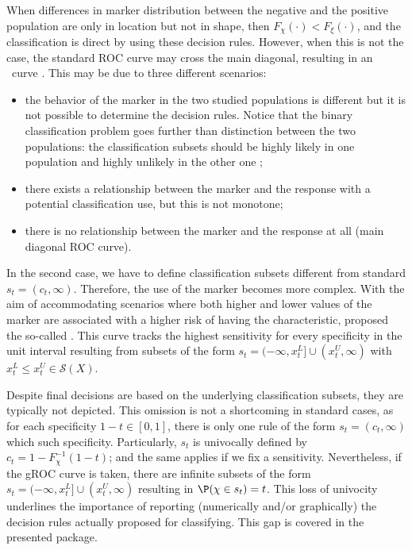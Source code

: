 When differences in marker distribution between the negative and the positive population are only in location but not in shape, then $F_\chi(\cdot) < F_\xi(\cdot)$, and the classification is direct by using these decision rules. However, when this is not the case, the standard ROC curve may cross the main diagonal, resulting in an  curve \citep{Dorfman1997}. This may be due to three different scenarios:
\begin{itemize}
\item[i)] the behavior of the marker in the two studied populations is different but it is not possible to determine the decision rules. Notice that the binary classification problem goes further than distinction between the two populations: the classification subsets should be highly likely in one population and highly unlikely in the other one \citep{Camblor2018a};
\item[ii)] there exists a relationship between the marker and the response with a potential classification use, but this is not monotone;
\item[iii)] there is no relationship between the marker and the response at all (main diagonal ROC curve).
\end{itemize}

In the second case, we have to define classification subsets different from standard $s_t=(c_t,\infty)$.
Therefore, the use of the marker becomes more complex. With the aim of accommodating scenarios where both higher and lower values of the marker are associated with a higher risk of having the characteristic, \citet{Camblor2017a} proposed the so-called . This curve tracks the highest sensitivity for every specificity in the unit interval resulting from subsets of the form $s_t=(-\infty, x_t^L] \cup (x_t^U, \infty)$ with $x_t^L \leq x_t^U \in \mathcal{S}(X)$.

Despite final decisions are based on the underlying classification subsets, they are typically not depicted.
This omission is not a shortcoming in standard cases, as for each specificity $1-t \in [0,1]$, there is only one rule of the form $s_t = (c_t, \infty)$ which such specificity. Particularly, $s_t$ is univocally defined by $c_t = 1 - F_\chi^{-1}(1-t)$; and the same applies if we fix a sensitivity. Nevertheless, if the gROC curve is taken, there are infinite subsets of the form $s_t=(-\infty, x_t^L] \cup (x_t^U, \infty)$ resulting in $\P(\chi \in s_t) = t$.
This loss of univocity underlines the importance of reporting (numerically and/or graphically) the decision rules actually proposed for classifying. This gap is covered in the presented package.

